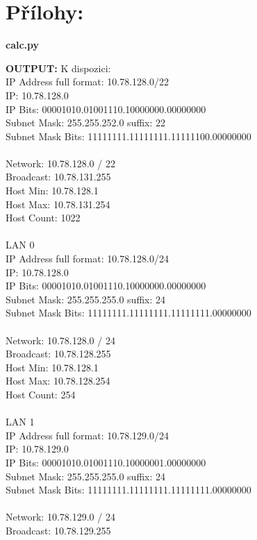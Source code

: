 \documentclass[10pt, a4paper]{article}%
\begin{document}
\section*{Přílohy:}
\noindent \textbf{calc.py}

\textbf{OUTPUT:}
K dispozici:\\
IP Address full format: 10.78.128.0/22\\
IP: 10.78.128.0\\
IP Bits: 00001010.01001110.10000000.00000000\\
Subnet Mask: 255.255.252.0 suffix: 22\\
Subnet Mask Bits: 11111111.11111111.11111100.00000000\\
\\
Network: 10.78.128.0 / 22\\
Broadcast: 10.78.131.255\\
Host Min: 10.78.128.1\\
Host Max: 10.78.131.254\\
Host Count: 1022\\
\\
LAN 0\\
IP Address full format: 10.78.128.0/24\\
IP: 10.78.128.0\\
IP Bits: 00001010.01001110.10000000.00000000\\
Subnet Mask: 255.255.255.0 suffix: 24\\
Subnet Mask Bits: 11111111.11111111.11111111.00000000\\
\\
Network: 10.78.128.0 / 24\\
Broadcast: 10.78.128.255\\
Host Min: 10.78.128.1\\
Host Max: 10.78.128.254\\
Host Count: 254\\
\\
LAN 1\\
IP Address full format: 10.78.129.0/24\\
IP: 10.78.129.0\\
IP Bits: 00001010.01001110.10000001.00000000\\
Subnet Mask: 255.255.255.0 suffix: 24\\
Subnet Mask Bits: 11111111.11111111.11111111.00000000\\
\\
Network: 10.78.129.0 / 24\\
Broadcast: 10.78.129.255\\
\end{document}
